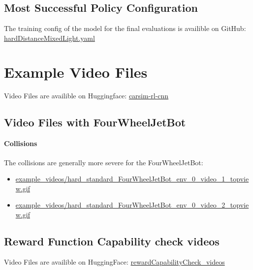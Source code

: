 \subsection{Most Successful Policy Configuration}
\label{cha:most_successful_config}

The training config of the model for the final evaluations is availible on GitHub:
\href{https://github.com/geschnee/carsim-rl-cnn/tree/main/python/cfg/hardDistanceMixedLight.yaml}{hardDistanceMixedLight.yaml}

\section{Example Video Files}
\label{cha:example_videos}

Video Files are availible on Huggingface:
\href{https://huggingface.co/geschnee/carsim-rl-cnn/tree/main/}{carsim-rl-cnn}

\subsection{Video Files with FourWheelJetBot}

\paragraph{Collisions}
\label{sec:fourwheel_collisions}

The collisions are generally more severe for the FourWheelJetBot:

\begin{itemize}
    \item \href{https://huggingface.co/geschnee/carsim-rl-cnn/blob/main/example_videos_FourWheelJetbot/hard_standard_FourWheelJetBot_env_0_video_1_topview.gif}{example\_videos/hard\_standard\_FourWheelJetBot\_env\_0\_video\_1\_topview.gif}
    \item \href{https://huggingface.co/geschnee/carsim-rl-cnn/blob/main/example_videos_FourWheelJetbot/hard_standard_FourWheelJetBot_env_0_video_2_topview.gif}{example\_videos/hard\_standard\_FourWheelJetBot\_env\_0\_video\_2\_topview.gif}
\end{itemize}

\subsection{Reward Function Capability check videos}
\label{sec:reward_capability_check_videos}

Video Files are availible on HuggingFace:
\href{https://huggingface.co/geschnee/carsim-rl-cnn/tree/main/rewardCapabilityCheck_videos}{rewardCapabilityCheck\_videos}


